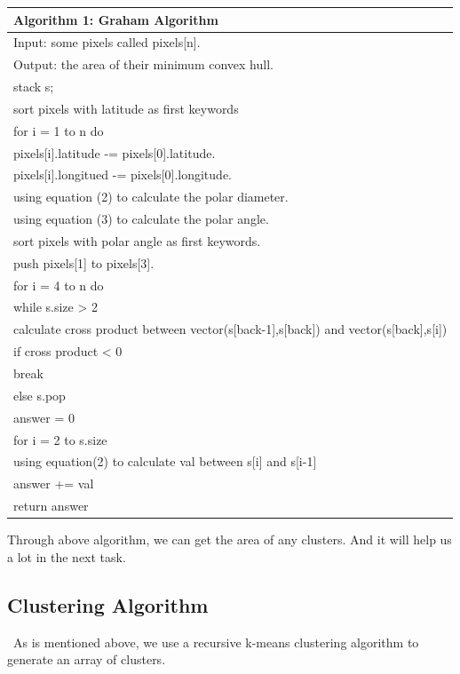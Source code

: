 \documentclass{mcmthesis}
\begin{document}
\begin{tabular}{l}
	\hline
	Algorithm 1: Graham Algorithm \\
	\hline
	Input: some pixels called pixels[n].\\
	Output: the area of their minimum convex hull.\\
	stack s;\\
	sort pixels with latitude as first keywords \\
	for i = 1 to n do \\
	\qquad pixels[i].latitude -= pixels[0].latitude.\\
	\qquad pixels[i].longitued -= pixels[0].longitude.\\
	\qquad using equation (2) to calculate the polar diameter.\\
	\qquad using equation (3) to calculate the polar angle.\\
	sort pixels with polar angle as first keywords.\\
	push pixels[1] to pixels[3].\\
	for i = 4 to n do \\
	\qquad while s.size > 2 \\
	\qquad\qquad calculate cross product between vector(s[back-1],s[back]) and vector(s[back],s[i]) \\
	\qquad\qquad if cross product < 0 \\
	\qquad\qquad\qquad break \\
	\qquad\qquad else s.pop  \\
	answer = 0 \\
	for i = 2 to s.size \\ 
	\qquad using equation(2) to calculate val between s[i] and s[i-1] \\
	\qquad answer += val\\
	return answer \\
	\hline
\end{tabular}

Through above algorithm, we can get the area of any clusters. And it will help us a lot in the next task. \\
\subsection{Clustering Algorithm}
\quad \, As is mentioned above, we use a recursive k-means clustering algorithm to generate an array of clusters.
\end{document}

